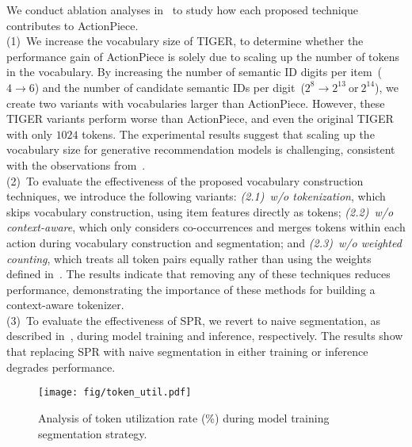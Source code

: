 We conduct ablation analyses in~ to study how each proposed technique contributes to ActionPiece.\\
\hspace*{3mm} (1)~We increase the vocabulary size of TIGER, to determine whether the performance gain of ActionPiece is solely due to scaling up the number of tokens in the vocabulary. By increasing the number of semantic ID digits per item~($4 \rightarrow 6$) and the number of candidate semantic IDs per digit~($2^8 \rightarrow 2^{13}\ \text{or}\ 2^{14}$), we create two variants with vocabularies larger than ActionPiece. However, these TIGER variants perform worse than ActionPiece, and even the original TIGER with only $1024$ tokens. The experimental results suggest that scaling up the vocabulary size for generative recommendation models is challenging, consistent with the observations from~\citet{zhang2024moc}.\\
\hspace*{3mm} (2)~To evaluate the effectiveness of the proposed vocabulary construction techniques, we introduce the following variants: \emph{(2.1)~w/o tokenization}, which skips vocabulary construction, using item features directly as tokens; \emph{(2.2)~w/o context-aware}, which only considers co-occurrences and merges tokens within each action during vocabulary construction and segmentation; and \emph{(2.3)~w/o weighted counting}, which treats all token pairs equally rather than using the weights defined in~. The results indicate that removing any of these techniques reduces performance, demonstrating the importance of these methods for building a context-aware tokenizer.\\
\hspace*{3mm} (3)~To evaluate the effectiveness of SPR, we revert to naive segmentation, as described in~, during model training and inference, respectively. The results show that replacing SPR with naive segmentation in either training or inference degrades performance.

\begin{figure}[t!]
    \begin{center}
    \texttt{[image: fig/token\_util.pdf]}
    \vskip -0.1in
    \caption{Analysis of token utilization rate (\%) during model training \wrt segmentation strategy.
    }
    \label{fig:token_util}
    \end{center}
    \vskip -0.3in
\end{figure}

